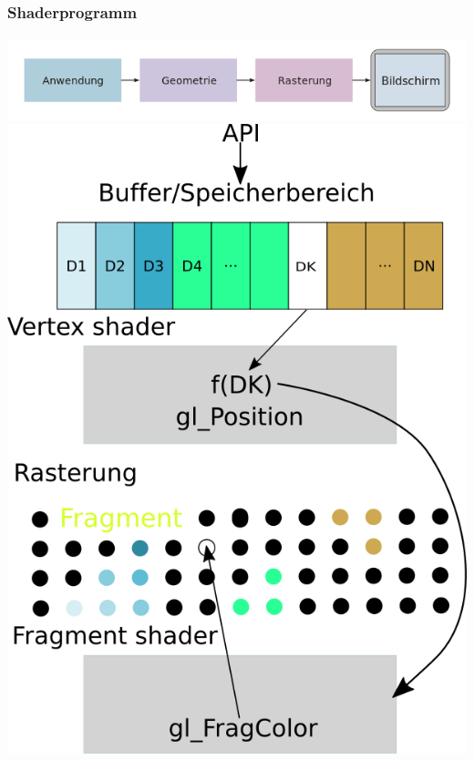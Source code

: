 \documentclass{beamer}
\begin{document}
\begin{frame}
    \frametitle{ Shaderprogramm}
\framesubtitle{}
\begin{center}
\includegraphics[scale=0.26]{images/cgpipeline_grob}
\\
\includegraphics[scale=0.20]{images/Zeichnung_Shaderpipeline}

\end{center}
\end{frame}
\end{document}
